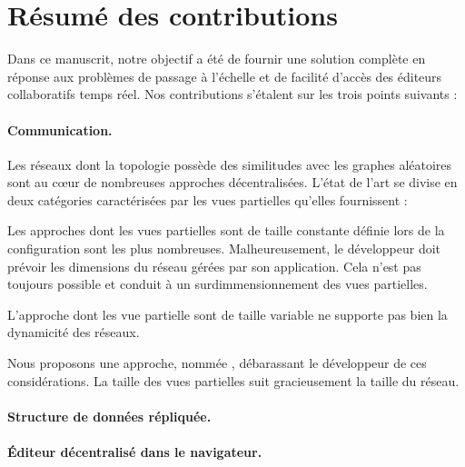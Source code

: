 
\section{Résumé des contributions}
\label{conclu:sec:summary}

Dans ce manuscrit, notre objectif a été de fournir une solution complète en
réponse aux problèmes de passage à l'échelle et de facilité d'accès des éditeurs
collaboratifs temps réel. Nos contributions s'étalent sur les trois points
suivants :

\paragraph{Communication.} Les réseaux dont la topologie possède des similitudes
avec les graphes aléatoires sont au cœur de nombreuses approches
décentralisées. L'état de l'art se divise en deux catégories caractérisées par
les vues partielles qu'elles fournissent :
\begin{inparaenum}[(i)]
\item Les approches dont les vues partielles sont de taille constante définie
  lors de la configuration sont les plus nombreuses. Malheureusement, le
  développeur doit prévoir les dimensions du réseau gérées par son
  application. Cela n'est pas toujours possible et conduit à un
  surdimmensionnement des vues partielles.
\item L'approche dont les vue partielle sont de taille variable ne supporte pas
  bien la dynamicité des réseaux. 
\end{inparaenum}
Nous proposons une approche, nommée \SPRAY, débarassant le développeur de ces
considérations. La taille des vues partielles suit gracieusement la taille du
réseau. 


\paragraph{Structure de données répliquée.}

\paragraph{Éditeur décentralisé dans le navigateur.}

